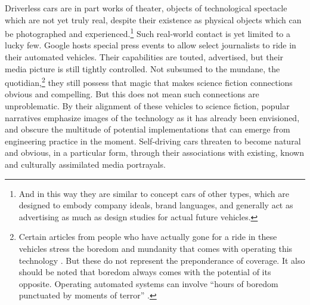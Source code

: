 Driverless cars
are in part works of theater, objects of technological spectacle which
are not yet truly real, despite their existence as physical objects
which can be photographed and experienced.\footnote{And in this way
  they are similar to concept cars of other types, which are designed
  to embody company ideals, brand languages, and generally act as
  advertising as much as design studies for actual future vehicles.}
Such real-world contact is 
yet limited to a lucky few. Google hosts special press events to allow
select journalists
to ride in their automated vehicles. Their capabilities are touted,
advertised, but their media picture is still tightly controlled. Not subsumed
to the mundane, the quotidian,\footnote{Certain articles from people
  who have actually gone for a ride in these vehicles stress the
  boredom and mundanity that comes with operating this
  technology \cite{rode500}. But these do not represent the
  preponderance of coverage. It also should be noted that boredom
  always comes with the potential of its opposite. Operating automated
systems can involve ``hours of boredom
punctuated by moments of terror'' \cite[p. 339]{sheridan}.} they still
possess that magic that 
makes science fiction connections obvious and compelling. But this
does not mean such connections are unproblematic. By
their alignment of these vehicles to science fiction, popular
narratives emphasize images of the technology as it has already been
envisioned, and obscure the multitude of potential implementations
that can emerge from engineering practice in the moment. Self-driving
cars threaten to become natural and obvious, in a particular form,
through their associations with existing, known and culturally
assimilated media portrayals.




